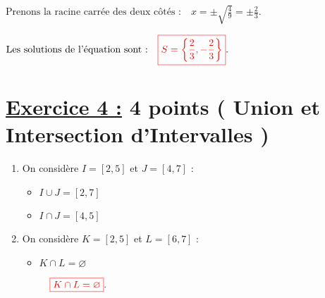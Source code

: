 \documentclass[12pt,a4paper]{article}
\begin{document}
\(
\text{Prenons la racine carrée des deux côtés :} \quad x = \pm \sqrt{\frac{4}{9}} = \pm \frac{2}{3}.
\)

\(
\text{Les solutions de l'équation sont :} \quad
\textcolor{red}{\boxed{S=\left\lbrace  \frac{2}{3},-\frac{2}{3} \right\rbrace }}.
\)


\section*{\underline{Exercice 4 :} 4 points ( Union et Intersection d'Intervalles )}  

\begin{enumerate}
    \item On considère $I = [2, 5]$ et $J = [4, 7]$ :
    \begin{itemize}
        \item $I \cup J = [2, 7]$
        \item $I \cap J = [4, 5]$
    \end{itemize}

    \item On considère $K = [2, 5]$ et $L = [6, 7]$ :
    \begin{itemize}
        \item $K \cap L = \varnothing$
        
 \(
 \quad
\textcolor{red}{\boxed{K \cap L = \varnothing  }}.
\)
    \end{itemize}
\end{enumerate}
\end{document}
